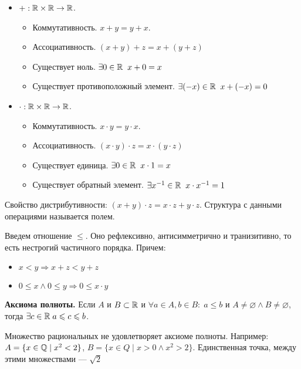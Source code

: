 \begin{itemize}
    \item $+: \mathbb{R} \times \mathbb{R} \to \mathbb{R}$.
        \begin{itemize}
            \item Коммутативность. $x+y=y+x$.
            \item Ассоциативность.  $(x+y)+z=x+(y+z)$
            \item Существует ноль.  $\exists 0 \in \mathbb{R} \; \; x + 0 = x$
            \item Существует противоположный элемент. $\exists (-x) \in \mathbb{R} \; \; x+(-x) = 0$
        \end{itemize}
    \item $\cdot: \mathbb{R} \times \mathbb{R} \to \mathbb{R}$.
        \begin{itemize}
            \item Коммутативность. $x\cdot y=y\cdot x$.
            \item Ассоциативность.  $(x\cdot y)\cdot z=x\cdot (y\cdot z)$
            \item Существует единица.  $\exists 0 \in \mathbb{R} \; \; x \cdot 1 = x$
            \item Существует обратный элемент. $\exists x^{-1} \in \mathbb{R} \; \; x \cdot x^{-1} = 1$
        \end{itemize}
\end{itemize}
Свойство дистрибутивности: $(x+y) \cdot z = x \cdot z + y \cdot z$. Структура с данными операциями называется полем.

Введем отношение $\le$. Оно рефлексивно, антисимметрично и транизитивно, то есть нестрогий частичного порядка. Причем:
\begin{itemize}
    \item $x< y \Rightarrow x+z < y+z$
    \item  $0 \le x \land 0 \le y \Rightarrow 0 \le x\cdot y$
\end{itemize}
\textbf{Аксиома полноты.} Если $A$ и $B \subset \mathbb{R}$ и $\forall a \in A, b \in B: \; a \le b$ и $A \neq \varnothing \land B \neq \varnothing$, тогда $\exists c \in \mathbb{R}\; a \leqslant c \leqslant b$.
\begin{remark}
    Множество рациональных не удовлетворяет аксиоме полноты. Например: $A = \{x \in \mathbb{Q} \; \vert \; x^2 < 2\}$,  $B = \{x \in Q \; \vert \; x>0 \land x^2 > 2\}$. Единственная точка, между этими множествами --- $\sqrt{2}$ 
\end{remark}

